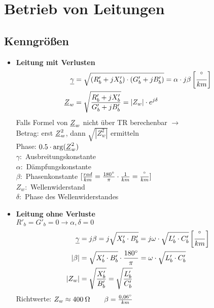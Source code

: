 \section{Betrieb von Leitungen}
\subsection{Kenngrößen}

\begin{itemize}
    \item[] \textbf{Leitung mit Verlusten}
    \begin{align*}
        \underline{\gamma} &= \sqrt{(R'_b +jX'_b)\cdot(G'_b+jB'_b)}= \alpha \cdot j \beta \left[\frac{\degree}{km} \right]\\
        \underline{Z}_w &= \sqrt{\dfrac{R'_b + jX'_b}{G'_b + jB'_b}}= |Z_w| \cdot e^{j\delta}
    \end{align*}
    \indent Falls Formel von $\underline{Z}_w$ nicht über TR berechenbar $\rightarrow$\\
    Betrag: erst $\underline{Z}_w^2$, dann $\sqrt{|Z_w^2|}$ ermitteln \\
    Phase: $0.5 \cdot \arg(\underline{Z}_w^2)$ \\

    \indent $\gamma:$ Ausbreitungskonstante\\
    \indent $\alpha:$ Dämpfungskonstante\\
    \indent $\beta:$ Phasenkonstante $[\frac{rad}{km} = \frac{180\degree}{\pi} \cdot \frac{1}{km} = \frac{\degree}{km}]$\\
    \indent $Z_w:$ Wellenwiderstand\\
    \indent $\delta:$ Phase des Wellenwiderstandes\\

    \item[] \textbf{Leitung ohne Verluste}\\
            $R'_b = G'_b = 0\rightarrow \alpha, \delta = 0$
        \begin{align*}
            \underline{\gamma} &= j \beta = j \sqrt{X'_b \cdot B'_b} = j \omega \cdot \sqrt{L'_b \cdot C'_b}\left[\frac{\degree}{km} \right]\\
            |\beta| &= \sqrt{X'_b \cdot B'_b} \cdot \frac{180\degree}{\pi} = \omega \cdot \sqrt{L'_b \cdot C'_b} \\
            |Z_w| &= \sqrt{ \dfrac{X'_b}{B'_b} } = \sqrt{ \dfrac{L'_b}{C'_b} }
        \end{align*}
    Richtwerte:
            $Z_w \approx 400\: \ohm \qquad \beta = \frac{0,06\degree}{km}$\\


\end{itemize}
